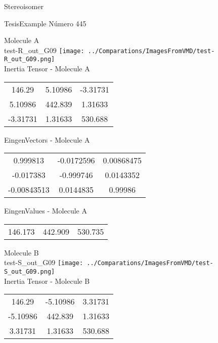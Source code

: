 \begin{center}
\vtab
\vtab
\textcolor{NavyBlue}{\Large Stereoisomer}
\end{center}

 \newpage

\vtab[-2cm]
\begin{center}
{\large TesisExample \tab Número 445}
\end{center}
\begin{multicols}{2}
\begin{center}

Molecule A \\ 
test-R\_out\_G09
\texttt{[image: ../Comparations/ImagesFromVMD/test-R\_out\_G09.png]}
\\
Inertia Tensor - Molecule A \\
\vtab

\begin{tabular}{|c c c|}
146.29	 & 	5.10986	 & 	-3.31731	 \\
5.10986	 & 	442.839	 & 	1.31633	 \\
-3.31731	 & 	1.31633	 & 	530.688
\end{tabular}

\vtab
 EingenVectors - Molecule A     \\
\vtab
\begin{tabular}{|c c c|}
0.999813	 & 	-0.0172596	 & 	0.00868475	 \\
-0.017383	 & 	-0.999746	 & 	0.0143352	 \\
-0.00843513	 & 	0.0144835	 & 	0.99986
\end{tabular}

\vtab
 EingenValues - Molecule A     \\
\vtab
\begin{tabular}{|c c c|}
146.173	 & 	442.909	 & 	530.735	 \\
\end{tabular}
\columnbreak

Molecule B \\ 
test-S\_out\_G09
\texttt{[image: ../Comparations/ImagesFromVMD/test-S\_out\_G09.png]}
\\
Inertia Tensor - Molecule B \\
\vtab

\begin{tabular}{|c c c|}
146.29	 & 	-5.10986	 & 	3.31731	 \\
-5.10986	 & 	442.839	 & 	1.31633	 \\
3.31731	 & 	1.31633	 & 	530.688
\end{tabular}


\end{center}
\end{multicols}
